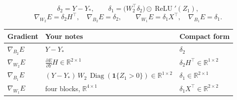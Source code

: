 \documentclass[11pt,a4paper]{article}
\newcommand{\R}{\mathbb{R}}
\newcommand{\ind}{\mathbf{1}}
\newcommand{\relu}{\operatorname{ReLU}}
\newcommand{\Diag}{\operatorname{Diag}}
\begin{document}
{\color{chg}
\begin{tcolorbox}[boxstyle]
\[
\delta_2=Y-Y_*,\qquad \delta_1=\bigl(W_2^{\top}\delta_2\bigr)\odot\relu'(Z_1),
\]
\[
\nabla_{W_2}E=\delta_2H^{\top},\quad \nabla_{B_2}E=\delta_2,\qquad
\nabla_{W_1}E=\delta_1X^{\top},\quad \nabla_{B_1}E=\delta_1 .
\]
\end{tcolorbox}

\begin{center}
\renewcommand{\arraystretch}{1.35}
\begin{tabular}{@{}lll@{}}
\toprule
Gradient & {\color{black}Your notes} & Compact form \\
\midrule
$\nabla_{B_2}E$ & {\color{black}$Y-Y_*$} & $\delta_2$ \\
$\nabla_{W_2}E$ & {\color{black}$\frac{\partial E}{\partial Y}H\in\R^{2\times1}$} & $\delta_2H^{\top}\in\R^{1\times2}$ \\
$\nabla_{B_1}E$ & {\color{black}$(Y-Y_*)\,W_2\,\Diag(\ind\{Z_1>0\})\in\R^{1\times2}$} & $\delta_1\in\R^{2\times1}$ \\
$\nabla_{W_1}E$ & {\color{black}four blocks, $\R^{4\times1}$} & $\delta_1X^{\top}\in\R^{2\times2}$ \\
\bottomrule
\end{tabular}
\end{center}
}
\end{document}
